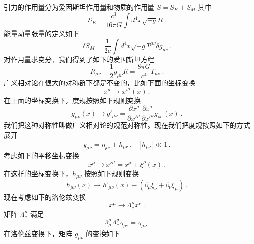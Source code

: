 
\begin{issues}
\issueNeedCite
\issueMissDepend
\end{issues}

引力的作用量分为爱因斯坦作用量和物质的作用量 $S=S_E+S_M$ 其中
\begin{equation}
S_E = \frac{c^3}{16\pi G} \int d^4 x \sqrt{-g} R~.
\end{equation}
能量动量张量的定义如下
\begin{equation}
\delta S_M = \frac{1}{2 c} \int d^4 x \sqrt{-g} T^{\mu\nu} \delta g_{\mu\nu} ~. 
\end{equation}
对作用量求变分，我们得到了如下的爱因斯坦方程
\begin{equation}
R_{\mu\nu} - \frac{1}{2} g_{\mu\nu} R = \frac{8\pi G}{c^4} T_{\mu\nu} ~. 
\end{equation}
广义相对论在很大的对称群下都是不变的，比如下面的坐标变换
\begin{equation}
x^\mu \rightarrow x'^\mu (x) ~. 
\end{equation}
在上面的坐标变换下，度规按照如下规则变换
\begin{equation}
g_{\mu\nu} (x) \rightarrow g'_{\mu\nu}  = \frac{\partial x^\rho}{\partial x'^\mu} \frac{\partial x^\sigma}{\partial x'^\nu} g_{\rho\sigma} (x) ~. 
\end{equation}
我们把这种对称性叫做广义相对论的规范对称性。现在我们把度规按照如下的方式展开
\begin{equation}\label{eq_Geomet_1}
g_{\mu\nu} = \eta_{\mu\nu} + h_{\mu\nu}~, \quad |h_{\mu\nu}| \ll 1 ~. 
\end{equation} 
考虑如下的平移坐标变换
\begin{equation}
x^\mu \rightarrow x'^\mu = x^\mu + \xi^\mu (x) ~. 
\end{equation}
在这样的坐标变换下，$h_{\mu\nu}$ 按照如下规则变换
\begin{equation}
h_{\mu\nu} (x) \rightarrow h'_{\mu\nu} (x) - (\partial_\mu\xi_\nu+\partial_\nu \xi_\mu) ~.
\end{equation}
现在考虑如下的洛伦兹变换
\begin{equation}
x^\mu \rightarrow \Lambda^\mu_\nu x^\nu ~.
\end{equation}
矩阵 $\Lambda^\mu_\nu$ 满足
\begin{equation}
\Lambda^\rho_\mu\Lambda^\sigma_\nu \eta_{\rho\sigma} = \eta_{\mu\nu} ~. 
\end{equation}
在洛伦兹变换下，矩阵 $g_{\mu\nu}$ 的变换如下
